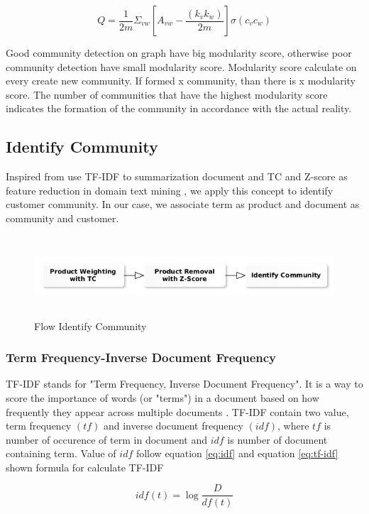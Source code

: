 \documentclass[conference]{IEEEtran}
\begin{document}
\begin{equation}
	\label{eq:modularity_GN}
    Q = \frac{1}{2m} \Sigma_{vw} [A_{vw} - \frac{(k_{v}k_{w})}{2m}] \sigma(c_{v}c_{w})
\end{equation}

Good community detection on graph have big modularity score, otherwise poor community detection have small modularity score. Modularity score calculate on every create new community. If formed x community, than there is x modularity score. The number of communities that have the highest modularity score indicates the formation of the community in accordance with the actual reality.
\subsection{Identify Community}
Inspired from use TF-IDF to summarization document and TC and Z-score as feature reduction in domain text mining \cite{Munggaran}, we apply this concept to identify customer community. In our case, we associate term as product and document as community and customer.

\begin{figure}[h]
\centering
\includegraphics[width=\columnwidth, height=3cm,keepaspectratio]{figure/identify_community}
\caption{Flow Identify Community}
\label{bidirectional_edge}
\end{figure}

\subsubsection{Term Frequency-Inverse Document Frequency}
TF-IDF stands for "Term Frequency, Inverse Document Frequency". It is a way to score the importance of words (or "terms") in a document based on how frequently they appear across multiple documents \cite{Lan}. TF-IDF contain two value, term frequency \((tf)\) and inverse document frequency \((idf)\), where \(tf\) is number of occurence of term in document and \(idf\) is number of document containing term. Value of \(idf\) follow equation \ref{eq:idf} and equation \ref{eq:tf-idf} shown formula for calculate TF-IDF

\begin{equation}
	\label{eq:idf}
    idf(t) = \log  \frac{D}{df(t)}
\end{equation}
\end{document}
